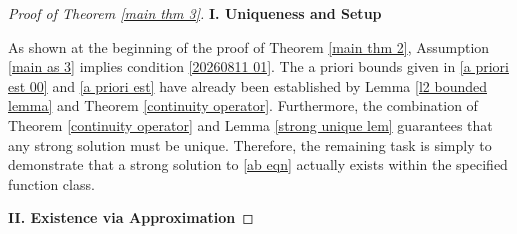 \documentclass[11pt,reqno]{amsart}
\theoremstyle{definition}
\theoremstyle{remark}
\numberwithin{equation}{section}
\begin{document}
\vspace{3mm}
\begin{proof}[Proof of Theorem \ref{main thm 3}]




\vspace{2mm}
{\bf I. Uniqueness and Setup}
\vspace{2mm}


As shown at the beginning of the proof of Theorem \ref{main thm 2},
Assumption \ref{main as 3} implies condition \eqref{20260811 01}.
The a priori bounds given in \eqref{a priori est 00} and \eqref{a priori est} have already been established by Lemma \ref{l2 bounded lemma} and Theorem \ref{continuity operator}.
 Furthermore, the combination of Theorem \ref{continuity operator} and Lemma \ref{strong unique lem} guarantees that any strong solution must be unique. Therefore, the remaining task is simply to demonstrate that a strong solution to \eqref{ab eqn} actually exists within the specified function class.


\vspace{2mm}
{\bf II. Existence via Approximation}
\vspace{2mm}




\end{proof}
\end{document}
